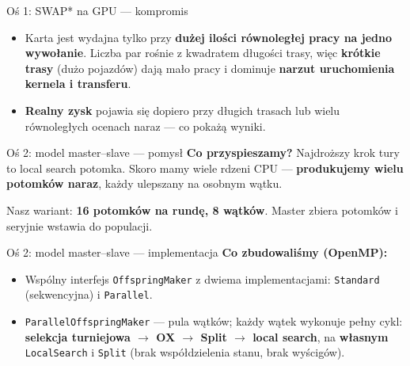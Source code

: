 \documentclass[aspectratio=169,11pt]{beamer}
\begin{document}
\begin{frame}{Oś 1: SWAP* na GPU — kompromis}
  \begin{itemize}
    \item Karta jest wydajna tylko przy \textbf{dużej ilości równoległej pracy na jedno wywołanie}. Liczba par rośnie z kwadratem długości trasy, więc \textbf{krótkie trasy} (dużo pojazdów) dają mało pracy i dominuje \textbf{narzut uruchomienia kernela i transferu}.
    \item \textbf{Realny zysk} pojawia się dopiero przy długich trasach lub wielu równoległych ocenach naraz — co pokażą wyniki.
  \end{itemize}
\end{frame}

\begin{frame}{Oś 2: model master--slave — pomysł}
  \textbf{Co przyspieszamy?} Najdroższy krok tury to local search potomka. Skoro mamy wiele rdzeni CPU — \textbf{produkujemy wielu potomków naraz}, każdy ulepszany na osobnym wątku.
  \vfill
  \centering
  \vfill
  {\footnotesize Nasz wariant: \textbf{16 potomków na rundę, 8 wątków}. Master zbiera potomków i seryjnie wstawia do populacji.}
\end{frame}

\begin{frame}[fragile]{Oś 2: model master--slave — implementacja}
  \textbf{Co zbudowaliśmy (OpenMP):}
  \begin{itemize}
    \item Wspólny interfejs \texttt{OffspringMaker} z dwiema implementacjami: \texttt{Standard} (sekwencyjna) i \texttt{Parallel}.
    \item \texttt{ParallelOffspringMaker} — pula wątków; każdy wątek wykonuje pełny cykl: \textbf{selekcja turniejowa $\to$ OX $\to$ Split $\to$ local search}, na \textbf{własnym} \texttt{LocalSearch} i \texttt{Split} (brak współdzielenia stanu, brak wyścigów).
  \end{itemize}
  \vspace{0.3em}
\end{frame}
\end{document}
